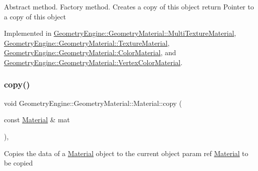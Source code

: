 Abstract method. Factory method. Creates a copy of this object return Pointer to a copy of this object 

Implemented in \mbox{\hyperlink{class_geometry_engine_1_1_geometry_material_1_1_multi_texture_material_a66cef99b68270e1399830bc1b8bc8502}{Geometry\+Engine\+::\+Geometry\+Material\+::\+Multi\+Texture\+Material}}, \mbox{\hyperlink{class_geometry_engine_1_1_geometry_material_1_1_texture_material_ace905cf02deb41ad8aa422ef2fb9070f}{Geometry\+Engine\+::\+Geometry\+Material\+::\+Texture\+Material}}, \mbox{\hyperlink{class_geometry_engine_1_1_geometry_material_1_1_color_material_a29dbf04e76b75fcc86f184d072bba0a5}{Geometry\+Engine\+::\+Geometry\+Material\+::\+Color\+Material}}, and \mbox{\hyperlink{class_geometry_engine_1_1_geometry_material_1_1_vertex_color_material_aecf808e45985f2a39662937fc18a21d0}{Geometry\+Engine\+::\+Geometry\+Material\+::\+Vertex\+Color\+Material}}.

\mbox{\label{class_geometry_engine_1_1_geometry_material_1_1_material_a632cdbe72ea955bc591a3902f63b6061}} 
\subsubsection{\texorpdfstring{copy()}{copy()}}
{\footnotesize\ttfamily void Geometry\+Engine\+::\+Geometry\+Material\+::\+Material\+::copy (\begin{DoxyParamCaption}\item[{const \mbox{\hyperlink{class_geometry_engine_1_1_geometry_material_1_1_material}{Material}} \&}]{mat }\end{DoxyParamCaption})\hspace{0.3cm}{\ttfamily [protected]}, {\ttfamily [virtual]}}

Copies the data of a \mbox{\hyperlink{class_geometry_engine_1_1_geometry_material_1_1_material}{Material}} object to the current object param ref \mbox{\hyperlink{class_geometry_engine_1_1_geometry_material_1_1_material}{Material}} to be copied \mbox{\label{class_geometry_engine_1_1_geometry_material_1_1_material_ae337c74e4f500d0a881779c2c3495908}} 
